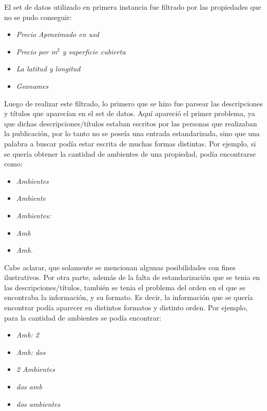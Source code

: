 \documentclass[a4paper, 10pt]{article}
\begin{document}
			El set de datos utilizado en primera instancia fue filtrado por las propiedades que no se pudo conseguir:
		
		\begin{itemize}
		\item \emph{Precio Aproximado en usd}
			
		\item \emph{Precio por m$^2$ y superficie cubierta}

		\item \emph{La latitud y longitud} 
			
		\item \emph{Geonames} 
			
		\end{itemize}
		
		Luego de realizar este filtrado, lo primero que se hizo fue parsear las descripciones y títulos que aparecían en el set de datos. Aquí apareció el primer problema, ya que dichas descripciones/títulos estaban escritos por las personas que realizaban la publicación, por lo tanto no se poseía una entrada estandarizada, sino que una palabra a buscar podía estar escrita de muchas formas distintas. Por ejemplo, si se quería obtener la cantidad de ambientes de una propiedad, podía encontrarse como:
			\begin{itemize}
				\item \emph{Ambientes}
				\item \emph{Ambiente}
				\item \emph{Ambientes:}
				\item \emph{Amb}
				\item \emph{Amb.} 
			\end{itemize}
		Cabe aclarar, que solamente se mencionan algunas posibilidades con fines ilustrativos. Por otra parte, además de la falta de estandarización que se tenia en las descripciones/títulos, también se tenia el problema del orden en el que se encontraba la información, y su formato. Es decir, la información que se quería encontrar podía aparecer en distintos formatos y distinto orden. Por ejemplo, para la cantidad de ambientes se podía encontrar: 
			\begin{itemize}
				\item \emph{Amb: 2}
				\item \emph{Amb: dos}
				\item \emph{2 Ambientes}
				\item \emph{dos amb}
				\item \emph{dos ambientes} 
			\end{itemize}
\end{document}
